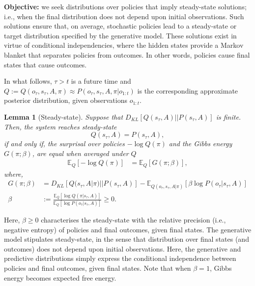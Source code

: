 \documentclass[review,12pt,authoryear]{elsarticle}
\newtheorem{lemma}[theorem]{Lemma}
\begin{document}
\textbf{Objective:} we seek distributions over policies that imply steady-state solutions; i.e., when the final distribution does not depend upon initial observations. Such solutions ensure that, on average, stochastic policies lead to a steady-state or target distribution specified by the generative model. These solutions exist in virtue of conditional independencies, where the hidden states provide a Markov blanket that separates policies from outcomes. In other words, policies cause final states that cause outcomes.

In what follows, $\tau >t$ is a future time and $Q:=Q(o_\tau, s_\tau, A, \pi) \approx P(o_\tau, s_\tau, A, \pi|o_{1:t})$ is the corresponding approximate posterior distribution, given observations $o_{1:t}$.

\begin{lemma}[Steady-state]
\label{lemma:steady-state}
Suppose that $D_{KL}[Q(s_\tau, A) ||P(s_\tau, A)]$ is finite. Then, the system reaches steady-state
\begin{equation*}
    Q(s_\tau, A) =P(s_\tau, A),
\end{equation*}
 if and only if, the surprisal over policies $-\log Q(\pi)$ and the Gibbs energy $G(\pi; \beta)$, are equal when averaged under $Q$
\begin{align}
\label{eq: condition for post over policies}
    \mathbb E_Q[-\log Q(\pi)]&= \mathbb E_Q[G(\pi; \beta)],
\end{align}
where,
\begin{align}
    G(\pi; \beta) &= D_{KL}[Q(s_\tau, A|\pi)||P(s_\tau,A)]-\mathbb E_{Q(o_\tau, s_\tau, A|\pi)} [\beta \log P(o_\tau |s_\tau, A)] \label{eq: Gibbs free energy}\\
    \beta &:= \frac{\mathbb E_Q[\log Q(\pi|s_\tau,A)]}{\mathbb E_Q[\log P(o_\tau|s_\tau,A)]} \geq 0. \nonumber
\end{align}
\end{lemma}

Here, $\beta \geq 0$ characterises the steady-state with the relative precision (i.e., negative entropy) of policies and final outcomes, given final states. The generative model stipulates steady-state, in the sense that distribution over final states (and outcomes) does not depend upon initial observations. Here, the generative and predictive distributions simply express the conditional independence between policies and final outcomes, given final states. Note that when $\beta = 1$, Gibbs energy becomes expected free energy.
\end{document}
